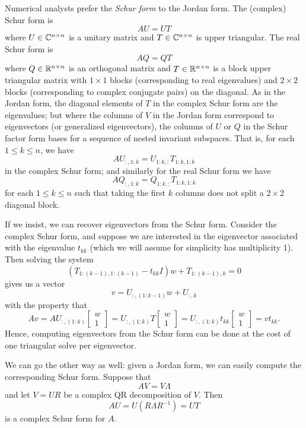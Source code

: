 \documentclass[12pt, leqno]{article}
\begin{document}
Numerical analysts prefer the {\em Schur form} to the Jordan form.
The (complex) Schur form is
\[
  A U = U T
\]
where $U \in \mathbb{C}^{n \times n}$ is a unitary matrix and
$T \in \mathbb{C}^{n \times n}$ is upper triangular.  The
real Schur form is
\[
  A Q = Q T
\]
where $Q \in \mathbb{R}^{n \times n}$ is an orthogonal matrix and $T \in
\mathbb{R}^{n \times n}$ is a block upper triangular matrix with $1 \times
1$ blocks (corresponding to real eigenvalues) and $2 \times 2$ blocks
(corresponding to complex conjugate pairs) on the diagonal.  As in the
Jordan form, the diagonal elements of $T$ in the complex Schur form
are the eigenvalues; but where the columns of $V$ in the Jordan form
correspond to eigenvectors (or generalized eigenvectors), the columns
of $U$ or $Q$ in the Schur factor form bases for a sequence of nested
invariant subspaces.  That is, for each $1 \leq k \leq n$, we have
\[
  A U_{:,1:k} = U_{1:k,:} T_{1:k,1:k}
\]
in the complex Schur form; and similarly for the real Schur form we
have
\[
  A Q_{:,1:k} = Q_{1:k,:} T_{1:k,1:k}
\]
for each $1 \leq k \leq n$ such that taking the first $k$ columns does
not split a $2 \times 2$ diagonal block.

If we insist, we can recover eigenvectors from the Schur form.
Consider the complex Schur form, and suppose we are interested
in the eigenvector associated with the eigenvalue $t_{kk}$
(which we will assume for simplicity has multiplicity 1).
Then solving the system
\[
  \left( T_{1:(k-1),1:(k-1)} - t_{kk} I \right) w + T_{1:(k-1),k} = 0
\]
gives us a vector
\[
  v = U_{:,(1:k-1)} w + U_{:,k}
\]
with the property that
\[
  A v
  = A U_{:,(1:k)} \begin{bmatrix} w \\ 1 \end{bmatrix}
  = U_{:,(1:k)} T \begin{bmatrix} w \\ 1 \end{bmatrix}
  = U_{:,(1:k)} t_{kk} \begin{bmatrix} w \\ 1 \end{bmatrix}
  = v t_{kk}.
\]
Hence, computing eigenvectors from the Schur form can be done
at the cost of one triangular solve per eigenvector.

We can go the other way as well: given a Jordan form, we can
easily compute the corresponding Schur form.  Suppose that
\[
  AV = V \Lambda
\]
and let $V = UR$ be a complex QR decomposition of $V$.  Then
\[
  AU = U (R \Lambda R^{-1}) = UT
\]
is a complex Schur form for $A$.
\end{document}
